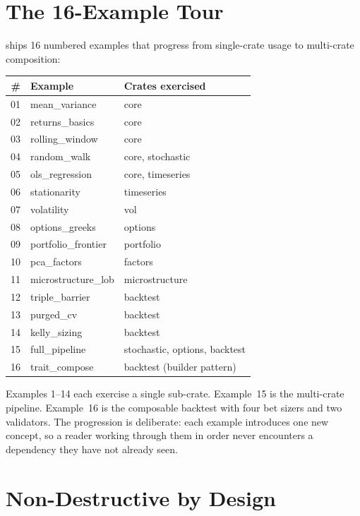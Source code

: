 \section{The 16-Example Tour}

 ships 16 numbered examples that progress from
single-crate usage to multi-crate composition:

\begin{center}
\begin{tabular}{rlp{6.5cm}}
\toprule
\# & \textbf{Example} & \textbf{Crates exercised} \\
\midrule
01 & mean\_variance           & core \\
02 & returns\_basics          & core \\
03 & rolling\_window          & core \\
04 & random\_walk             & core, stochastic \\
05 & ols\_regression          & core, timeseries \\
06 & stationarity             & timeseries \\
07 & volatility               & vol \\
08 & options\_greeks          & options \\
09 & portfolio\_frontier      & portfolio \\
10 & pca\_factors             & factors \\
11 & microstructure\_lob      & microstructure \\
12 & triple\_barrier          & backtest \\
13 & purged\_cv               & backtest \\
14 & kelly\_sizing            & backtest \\
15 & full\_pipeline           & stochastic, options, backtest \\
16 & trait\_compose           & backtest (builder pattern) \\
\bottomrule
\end{tabular}
\end{center}

Examples 1--14 each exercise a single sub-crate. Example~15 is the
multi-crate pipeline. Example~16 is the composable backtest with four
bet sizers and two validators. The progression is deliberate: each
example introduces one new concept, so a reader working through them
in order never encounters a dependency they have not already seen.

\section{Non-Destructive by Design}

